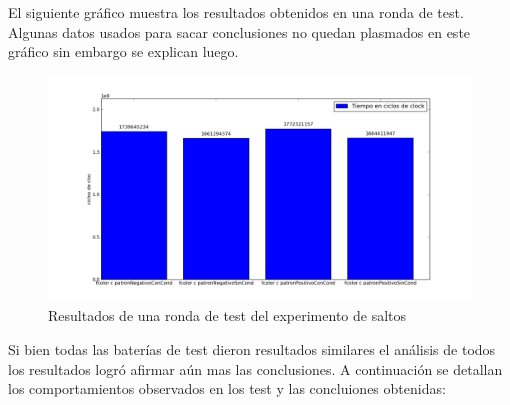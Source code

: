 	El siguiente gráfico muestra los resultados obtenidos en una ronda de test.
Algunas datos usados para sacar conclusiones no quedan plasmados en este gráfico sin
embargo se explican luego.

\begin{figure}[H]
\begin{center}
  \includegraphics[scale=0.5]{secciones/filtro_color/graficos/performanceExpSaltos.png}
\end{center}
\caption{Resultados de una ronda de test del experimento de saltos}
\label{fig: Tiempos Experimento Saltos}
\end{figure}

	Si bien todas las baterías de test dieron resultados similares el análisis de todos
los resultados logró afirmar aún mas las conclusiones. A continuación
se detallan los comportamientos observados en los test y las concluiones obtenidas:

